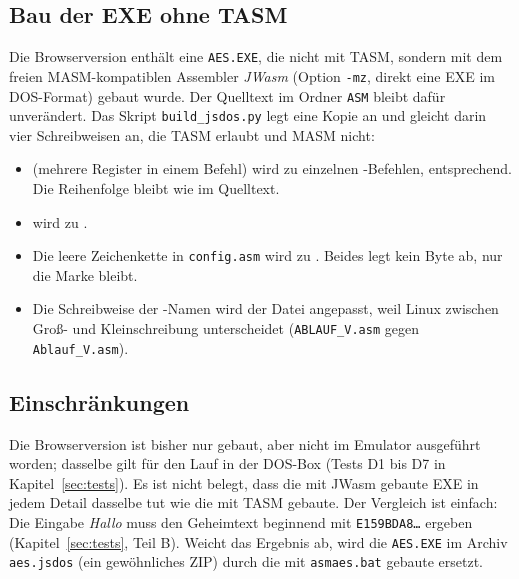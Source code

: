 \subsection{Bau der EXE ohne TASM}
Die Browserversion enthält eine \texttt{AES.EXE}, die nicht mit TASM, sondern mit dem freien MASM-kompatiblen Assembler \emph{JWasm} (Option \texttt{-mz}, direkt eine EXE im DOS-Format) gebaut wurde. Der Quelltext im Ordner \texttt{ASM} bleibt dafür unverändert. Das Skript \texttt{build\_jsdos.py} legt eine Kopie an und gleicht darin vier Schreibweisen an, die TASM erlaubt und MASM nicht:
\begin{itemize}
  \item {} (mehrere Register in einem Befehl) wird zu einzelnen -Befehlen,  entsprechend. Die Reihenfolge bleibt wie im Quelltext.
  \item {} wird zu .
  \item Die leere Zeichenkette  in \texttt{config.asm} wird zu . Beides legt kein Byte ab, nur die Marke bleibt.
  \item Die Schreibweise der -Namen wird der Datei angepasst, weil Linux zwischen Groß- und Kleinschreibung unterscheidet (\texttt{ABLAUF\_V.asm} gegen \texttt{Ablauf\_V.asm}).
\end{itemize}

\subsection{Einschränkungen}
Die Browserversion ist bisher nur gebaut, aber nicht im Emulator ausgeführt worden; dasselbe gilt für den Lauf in der DOS-Box (Tests D1 bis D7 in Kapitel~\ref{sec:tests}). Es ist nicht belegt, dass die mit JWasm gebaute EXE in jedem Detail dasselbe tut wie die mit TASM gebaute. Der Vergleich ist einfach: Die Eingabe \emph{Hallo} muss den Geheimtext beginnend mit \texttt{E159BDA8\ldots} ergeben (Kapitel~\ref{sec:tests}, Teil B). Weicht das Ergebnis ab, wird die \texttt{AES.EXE} im Archiv \texttt{aes.jsdos} (ein gewöhnliches ZIP) durch die mit \texttt{asmaes.bat} gebaute ersetzt.
